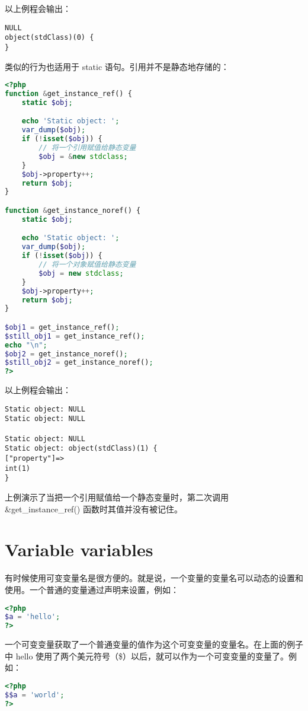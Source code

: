 以上例程会输出：

\begin{verbatim}
NULL
object(stdClass)(0) {
}
\end{verbatim}

类似的行为也适用于 static 语句。引用并不是静态地存储的：

\begin{lstlisting}[language=PHP]
<?php
function &get_instance_ref() {
    static $obj;

    echo 'Static object: ';
    var_dump($obj);
    if (!isset($obj)) {
        // 将一个引用赋值给静态变量
        $obj = &new stdclass;
    }
    $obj->property++;
    return $obj;
}

function &get_instance_noref() {
    static $obj;

    echo 'Static object: ';
    var_dump($obj);
    if (!isset($obj)) {
        // 将一个对象赋值给静态变量
        $obj = new stdclass;
    }
    $obj->property++;
    return $obj;
}

$obj1 = get_instance_ref();
$still_obj1 = get_instance_ref();
echo "\n";
$obj2 = get_instance_noref();
$still_obj2 = get_instance_noref();
?>
\end{lstlisting}

以上例程会输出：

\begin{verbatim}
Static object: NULL
Static object: NULL

Static object: NULL
Static object: object(stdClass)(1) {
["property"]=>
int(1)
}
\end{verbatim}

上例演示了当把一个引用赋值给一个静态变量时，第二次调用 \&get\_instance\_ref() 函数时其值并没有被记住。

\section{Variable variables}


有时候使用可变变量名是很方便的。就是说，一个变量的变量名可以动态的设置和使用。一个普通的变量通过声明来设置，例如：


\begin{lstlisting}[language=PHP]
<?php
$a = 'hello';
?>
\end{lstlisting}

一个可变变量获取了一个普通变量的值作为这个可变变量的变量名。在上面的例子中 hello 使用了两个美元符号（\$）以后，就可以作为一个可变变量的变量了。例如：


\begin{lstlisting}[language=PHP]
<?php
$$a = 'world';
?>
\end{lstlisting}

